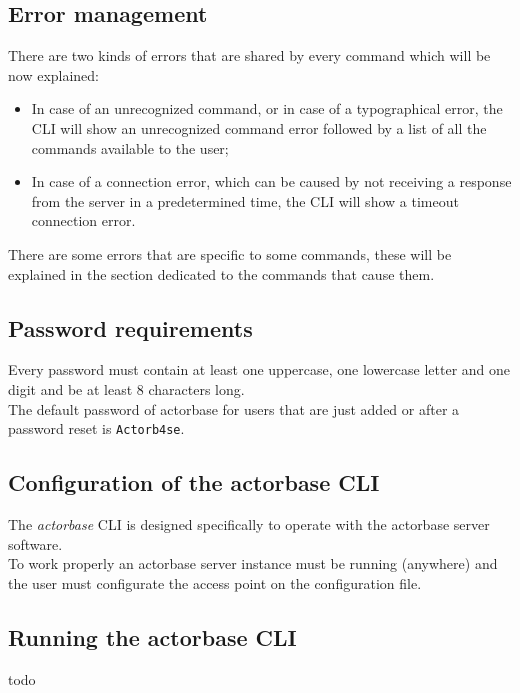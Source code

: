 \documentclass{scalatekids-article}
\begin{document}
\subsection{Error management}

There are two kinds of errors that are shared by every command which will be
now explained:
\begin{itemize}
\item In case of an unrecognized command, or in case of a typographical error,
  the CLI will show an unrecognized command error followed by a list of all
  the commands available to the user;
\item In case of a connection error, which can be caused by not receiving a
  response from the server in a predetermined time, the CLI will show a
  timeout connection error.
\end{itemize}
There are some errors that are specific to some commands, these will be explained
in the section dedicated to the commands that cause them.


\subsection{Password requirements}
\label{sec:passwordrequirement}
Every password must contain at least one uppercase, one lowercase letter and one
digit and be at least 8 characters long.\\
The default password of actorbase for users that are just added or after a password reset is \texttt{Actorb4se}.

\subsection{Configuration of the actorbase CLI}
\label{sec:configurationcli}
The \textit{actorbase} CLI is designed specifically to operate
with the actorbase server software.\\
To work properly an actorbase server instance must be running
(anywhere) and the user must configurate the access point on the configuration file.

\subsection{Running the actorbase CLI}
todo
\end{document}
